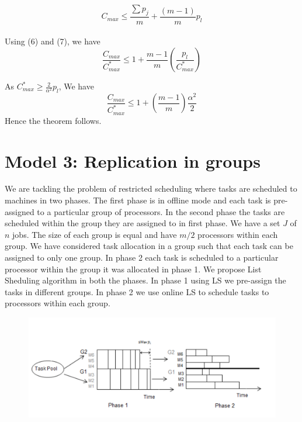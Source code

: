 \documentclass[10pt, conference, compsocconf]{IEEEtran}
\begin{document}
\begin{equation}
C_{max} \leq  \frac{\sum {p_j}}{m} + \frac{(m-1)}{m}p_l
\end{equation}
\\
Using (6) and (7), we have\\

\begin{equation}\nonumber
\frac{C_{max}}{C_{max}^{*}} \leq 1 + {\frac{m-1}{m}}(\frac{p_l}{C_{max}^{*}})
\end{equation}

As $C_{max}^{*} \geq {\frac{2}{\alpha^{2}}} p_l $, We have \\

\begin{equation}\nonumber
\frac{C_{max}}{C_{max}^{*}} \leq 1 + (\frac{m-1}{m})\frac{\alpha^{2}}{2}
\end{equation}
Hence the theorem follows.   \\                            



\section{Model 3: Replication in groups}
We are tackling the  problem of restricted scheduling where tasks are scheduled to machines in two phases. The first phase is in offline mode and each task is pre-assigned to a particular  group of processors. In the second phase the tasks are scheduled  within the group they are assigned to in first phase.   We have a set $J$ of $ n$ jobs.  The size of each group is equal and have $m/2$ processors within each group.  We have considered task allocation in a group such that each task can be assigned to only one group.  In phase 2  each task is scheduled to a particular processor within the group it was allocated in phase 1.  We propose  List Sheduling algorithm in both the phases. In phase 1 using LS we pre-assign the tasks in different groups.  In phase 2 we use online LS to schedule tasks to processors within each group.

\begin{figure}[htp]
\centering
\includegraphics[width= 8 cm]{fig2}
\caption{}
\label{fig:fig2}
\end{figure}
\end{document}

